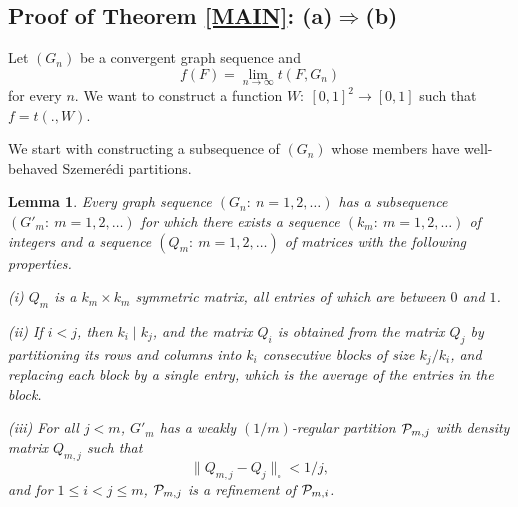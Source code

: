 \documentclass[fleqn]{article}
\newtheorem{lemma}[theorem]{Lemma}
\begin{document}
\subsection{Proof of Theorem \ref{MAIN}: (a)$\Rightarrow$(b)}

Let $(G_n)$ be a convergent graph sequence and
\[
f(F)=\lim_{n\to\infty} t(F,G_n)
\]
for every $n$. We want to construct a function $W:~[0,1]^2\to[0,1]$
such that $f=t(.,W)$.

We start with constructing a subsequence of $(G_n)$ whose members
have well-behaved Szemer\'edi partitions.

\begin{lemma}\label{SUBSEQ}
Every graph sequence $(G_n:~n=1,2,\dots)$ has a subsequence
$(G'_m:~m=1,2,\dots)$ for which there exists a sequence
$(k_m:~m=1,2,\dots)$ of integers and a sequence $(Q_m:~m=1,2,\dots)$
of matrices with the following properties.

\smallskip

{\rm (i)} $Q_m$ is a $k_m\times k_m$ symmetric matrix, all entries of
which are between $0$ and $1$.

\smallskip

{\rm (ii)} If $i<j$, then $k_i\mid k_j$, and the matrix $Q_i$ is
obtained from the matrix $Q_j$ by partitioning its rows and columns
into $k_i$ consecutive blocks of size $k_j/k_i$, and replacing each
block by a single entry, which is the average of the entries in the
block.

\smallskip

{\rm (iii)} For all $j<m$, $G'_m$ has a weakly $(1/m)$-regular
partition ${\cal P}_{m,j}$ with density matrix $Q_{m,j}$ such that
\begin{equation}\label{QDIST}
\|Q_{m,j}-Q_j\|_\square<1/j,
\end{equation}
and for $1\le i<j\le m$, ${\cal P}_{m,j}$ is a refinement of ${\cal P}_{m,i}$.
\end{lemma}
\end{document}
